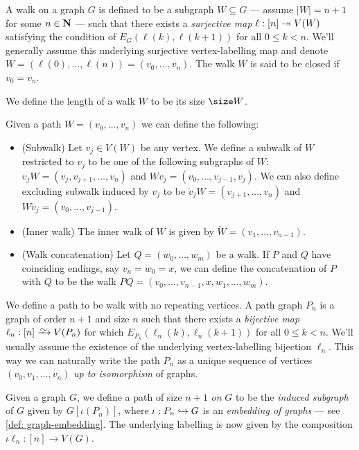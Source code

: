 \begin{definition}[Walk]\label{def: walk}
  A walk on a graph \(G\) is defined to be a subgraph \(W \subseteq G\) ---
  assume \(|W| = n + 1\) for some \(n \in \mathbf{N}\) --- such that there exists a
  \emph{surjective map} \(\ell: [n] \twoheadrightarrow V(W)\) satisfying the
  condition of \(E_G(\ell(k), \ell(k + 1))\) for all \(0 \leq k < n\). We'll
  generally assume this underlying surjective vertex-labelling map and denote
  \(W = (\ell(0), \dots, \ell(n)) = (v_0, \dots, v_n)\). The walk \(W\) is said
  to be closed if \(v_0 = v_n\).
\end{definition}

\begin{definition}[Length]\label{def: walk-length}
  We define the length of a walk \(W\) to be its size \(\size W\).
\end{definition}

\begin{definition}\label{def: walk-operations}
  Given a path \(W = (v_0, \dots, v_n)\) we can define the following:
  \begin{itemize}
    \setlength\itemsep{0.0em}
    \item (Subwalk) Let \(v_j \in V(W)\) be any vertex. We define a subwalk of
      \(W\) restricted to \(v_j\) to be one of the following subgraphs of \(W\):
      \(v_jW = (v_j, v_{j+1}, \dots, v_n)\) and \(Wv_j = (v_0, \dots, v_{j-1},
      v_j)\). We can also define excluding subwalk induced by \(v_j\) to be
      \(\breve v_j W = (v_{j+1}, \dots, v_n)\) and \(W \breve v_j = (v_0, \dots,
      v_{j-1})\).
    \item (Inner walk) The inner walk of \(W\) is given by \(\breve W = (v_1,
      \dots, v_{n-1})\).
    \item (Walk concatenation) Let \(Q = (w_0, \dots, w_m)\) be a walk.
      If \(P\) and \(Q\) have coinciding endings, say \(v_n = w_0 = x\), we can
      define the concatenation of \(P\) with \(Q\) to be the walk \(PQ = (v_0,
      \dots, v_{n-1}, x, w_1, \dots, w_m)\).
  \end{itemize}
\end{definition}

\begin{definition}[Path]\label{def: path}
  We define a path to be walk with no repeating vertices. A path graph \(P_n\)
  is a graph of order \(n + 1\) and size \(n\) such that there exists a
  \emph{bijective map} \(\ell_n: [n] \isoto V(P_n)\) for which
  \(E_{P_n}(\ell_n(k), \ell_n(k+1))\) for all \(0 \leq k < n\). We'll usually
  assume the existence of the underlying vertex-labelling bijection \(\ell_n\).
  This way we can naturally write the path \(P_n\) as a unique sequence of
  vertices \((v_0, v_1, \dots, v_n)\) \emph{up to isomorphism} of graphs.

  Given a graph \(G\), we define a path of size \(n + 1\) \emph{on} \(G\) to be
  the \emph{induced subgraph} of \(G\) given by \(G[\iota(P_n)]\), where
  \(\iota: P_n \hookrightarrow G\) is an \emph{embedding of graphs} --- see \cref{def:
  graph-embedding}. The underlying labelling is now given by the composition
  \(\iota \ell_n: [n] \to V(G)\).
\end{definition}

